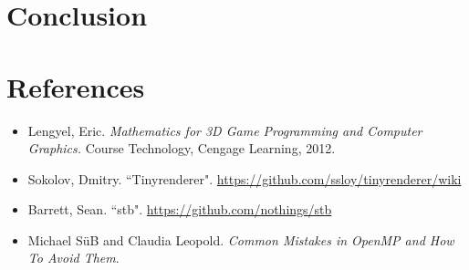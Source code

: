 \documentclass[12pt]{article}
\begin{document}
\section*{Conclusion}

\clearpage
\section*{References}

\begin{itemize}
	\item Lengyel, Eric. \textit{Mathematics for 3D Game Programming and Computer Graphics.} Course Technology,
Cengage Learning, 2012.
	\item Sokolov, Dmitry. ``Tinyrenderer". \url{https://github.com/ssloy/tinyrenderer/wiki}
	\item Barrett, Sean. ``stb". \url{https://github.com/nothings/stb}
	\item Michael S\"uB and Claudia Leopold. \textit{Common Mistakes in OpenMP and How To Avoid Them}.
\end{itemize}
\end{document}
